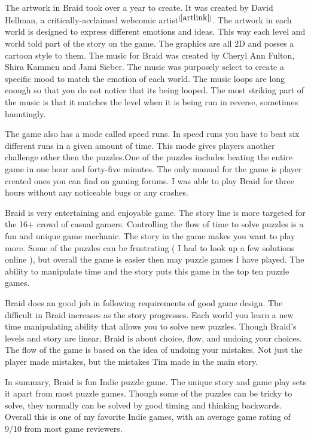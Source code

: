 \documentclass[a4paper,12pt]{report}
\begin{document}
The artwork in Braid took over a year to create.  It was created by David Hellman, a critically-acclaimed webcomic artist$^{[\ref{artlink}]}$.  The artwork in each world is designed to express different emotions and ideas.  This way each level and world told part of the story on the game.  The graphics are all 2D and posses a cartoon style to them.  The music for Braid was created by Cheryl Ann Fulton, Shira Kammen and Jami Sieber.  The music was purposely select to create a specific mood to match the emotion of each world.  The music loops are long enough so that you do not notice that its being looped.  The most striking part of the music is that it matches the level when it is being run in reverse, sometimes hauntingly.  

The game also has a mode called speed runs.  In speed runs you have to beat six different runs in a given amount of time.  This mode gives players another challenge other then the puzzles.One of the puzzles includes beating the entire game in one hour and forty-five minutes.  The only manual for the game is player created ones you can find on gaming forums.  I was able to play Braid for three hours without any noticeable bugs or any crashes.

Braid is very entertaining and enjoyable game.  The story line is more targeted for the 16+ crowd of casual gamers.  Controlling the flow of time to solve puzzles is a fun and unique game mechanic.  The story in the game makes you want to play more.  Some of the puzzles can be frustrating ( I had to look up a few solutions online ), but overall the game is easier then may puzzle games I have played.  The ability to manipulate time and the story puts this game in the top ten puzzle games.

Braid does an good job in following requirements of good game design.  The difficult in Braid increases as the story progresses.  Each world you learn a new time manipulating ability that allows you to solve new puzzles.  Though Braid's levels and story are linear, Braid is about choice, flow, and undoing your choices.  The flow of the game is based on the idea of undoing your mistakes.  Not just the player made mistakes, but the mistakes Tim made in the main story.      

In summary, Braid is fun Indie puzzle game.  The unique story and game play sets it apart from most puzzle games.  Though some of the puzzles can be tricky to solve, they normally can be solved by good timing and thinking backwards.  Overall this is one of my favorite Indie games, with an average game rating of 9/10 from most game reviewers. 
\end{document}

